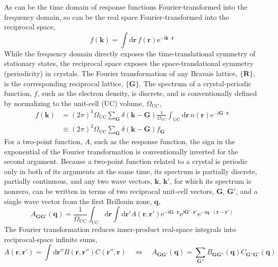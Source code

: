 As can be the time domain of response functions Fourier-transformed into the frequency domain, so can be the real space Fourier-transformed into the reciprocal space,
\begin{equation}
  f(\mathbf k)=\int\mathrm d\mathbf r\,f(\mathbf r)\mathrm e^{-\mathrm i\mathbf k\cdot\mathbf r}
\end{equation}
While the frequency domain directly exposes the time-translational symmetry of stationary states, the reciprocal space exposes the space-translational symmetry (periodicity) in crystals.
The Fourier transformation of any Bravais lattice, $\{\mathbf R\}$, is the corresponding reciprocal lattice, $\{\mathbf G\}$.
The spectrum of a crystal-periodic function, $f$, such as the electron density, is discrete, and is conventionally defined by normalizing to the unit-cell (UC) volume, $\Omega_\text{UC}$,
\begin{equation}
\begin{aligned}
  f(\mathbf k)&=(2\pi)^3\Omega_\text{UC}\sum_\mathbf G\delta(\mathbf k-\mathbf G)\frac1{\Omega_\text{UC}}\int_\text{UC}\mathrm d\mathbf r\,n(\mathbf r)\mathrm e^{-\mathrm i\mathbf G\cdot\mathbf r} \\
  &\equiv(2\pi)^3\Omega_\text{UC}\sum_\mathbf G\delta(\mathbf k-\mathbf G)f_\mathbf G
\end{aligned}
\end{equation}
For a two-point function, $A$, such as the response function, the sign in the exponential of the Fourier transformation is conventionally inverted for the second argument.
Because a two-point function related to a crystal is periodic only in both of its arguments at the same time, its spectrum is partially discrete, partially continuous, and any two wave vectors, $\mathbf k$, $\mathbf k'$, for which its spectrum is nonzero, can be written in terms of two reciprocal unit-cell vectors, $\mathbf G$, $\mathbf G'$, and a single wave vector from the first Brillouin zone, $\mathbf q$,
\begin{equation}
  A_{\mathbf G\mathbf G'}(\mathbf q)=\frac1{\Omega_\text{UC}}\int_\text{UC}\mathrm d\mathbf r\int\mathrm d\mathbf r'A(\mathbf r,\mathbf r')\mathrm e^{-\mathrm i\mathbf G\cdot\mathbf r}\mathrm e^{\mathrm i\mathbf G'\cdot\mathbf r'}\mathrm e^{-\mathrm i\mathbf q\cdot(\mathbf r-\mathbf r')}
\end{equation}
The Fourier transformation reduces inner-product real-space integrals into reciprocal-space infinite sums,
\begin{equation}
  A(\mathbf r,\mathbf r')=\int\mathrm d\mathbf r''B(\mathbf r,\mathbf r'')C(\mathbf r'',\mathbf r) \quad\Leftrightarrow\quad
  A_{\mathbf G\mathbf G'}(\mathbf q)=\sum_{\mathbf G''}B_{\mathbf G\mathbf G''}(\mathbf q)C_{\mathbf G''\mathbf G'}(\mathbf q)
\end{equation}
